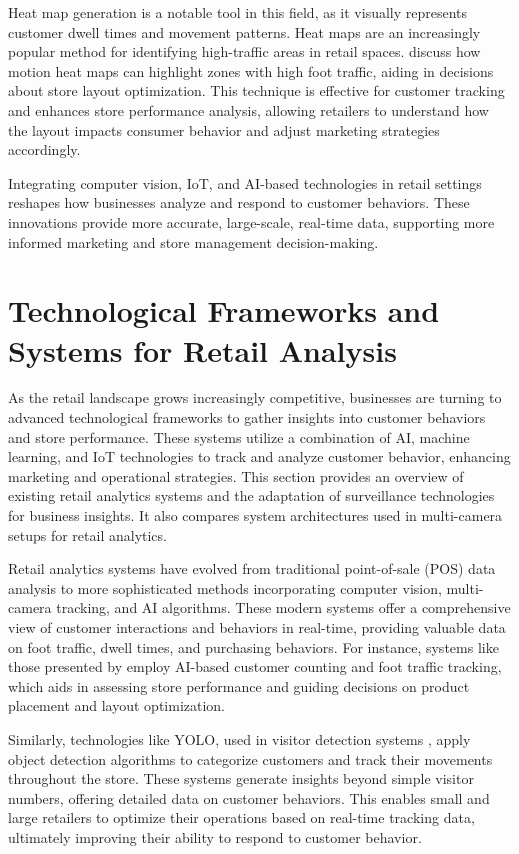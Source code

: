 {Heat map generation is a notable tool in this field, as it visually represents customer dwell times and movement patterns. Heat maps are an increasingly popular method for identifying high-traffic areas in retail spaces. \cite{Cabahug2023} discuss how motion heat maps can highlight zones with high foot traffic, aiding in decisions about store layout optimization. This technique is effective for customer tracking and enhances store performance analysis, allowing retailers to understand how the layout impacts consumer behavior and adjust marketing strategies accordingly.

Integrating computer vision, IoT, and AI-based technologies in retail settings reshapes how businesses analyze and respond to customer behaviors. These innovations provide more accurate, large-scale, real-time data, supporting more informed marketing and store management decision-making.

\section{Technological Frameworks and Systems for Retail Analysis}
As the retail landscape grows increasingly competitive, businesses are turning to advanced technological frameworks to gather insights into customer behaviors and store performance. These systems utilize a combination of AI, machine learning, and IoT technologies to track and analyze customer behavior, enhancing marketing and operational strategies. This section provides an overview of existing retail analytics systems and the adaptation of surveillance technologies for business insights. It also compares system architectures used in multi-camera setups for retail analytics.

Retail analytics systems have evolved from traditional point-of-sale (POS) data analysis to more sophisticated methods incorporating computer vision, multi-camera tracking, and AI algorithms. These modern systems offer a comprehensive view of customer interactions and behaviors in real-time, providing valuable data on foot traffic, dwell times, and purchasing behaviors. For instance, systems like those presented by \cite{Cabahug2023} employ AI-based customer counting and foot traffic tracking, which aids in assessing store performance and guiding decisions on product placement and layout optimization.

Similarly, technologies like YOLO, used in visitor detection systems  \citep{Erlina2023},  apply object detection algorithms to categorize customers and track their movements throughout the store. These systems generate insights beyond simple visitor numbers, offering detailed data on customer behaviors. This enables small and large retailers to optimize their operations based on real-time tracking data, ultimately improving their ability to respond to customer behavior.

}
